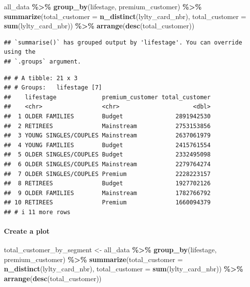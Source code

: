 \documentclass[
]{article}
\newenvironment{Shaded}{\begin{snugshade}}{\end{snugshade}}
\newcommand{\AttributeTok}[1]{\textcolor[rgb]{0.13,0.29,0.53}{#1}}
\newcommand{\FunctionTok}[1]{\textcolor[rgb]{0.13,0.29,0.53}{\textbf{#1}}}
\newcommand{\NormalTok}[1]{#1}
\newcommand{\OtherTok}[1]{\textcolor[rgb]{0.56,0.35,0.01}{#1}}
\newcommand{\SpecialCharTok}[1]{\textcolor[rgb]{0.81,0.36,0.00}{\textbf{#1}}}
\begin{document}
\begin{Shaded}
\begin{Highlighting}[]
\NormalTok{all\_data }\SpecialCharTok{\%\textgreater{}\%}
  \FunctionTok{group\_by}\NormalTok{(lifestage, premium\_customer) }\SpecialCharTok{\%\textgreater{}\%}
  \FunctionTok{summarize}\NormalTok{(}\AttributeTok{total\_customer =} \FunctionTok{n\_distinct}\NormalTok{(lylty\_card\_nbr),}
            \AttributeTok{total\_customer =} \FunctionTok{sum}\NormalTok{(lylty\_card\_nbr)) }\SpecialCharTok{\%\textgreater{}\%}
  \FunctionTok{arrange}\NormalTok{(}\FunctionTok{desc}\NormalTok{(total\_customer))}
\end{Highlighting}
\end{Shaded}

\begin{verbatim}
## `summarise()` has grouped output by 'lifestage'. You can override using the
## `.groups` argument.
\end{verbatim}

\begin{verbatim}
## # A tibble: 21 x 3
## # Groups:   lifestage [7]
##    lifestage             premium_customer total_customer
##    <chr>                 <chr>                     <dbl>
##  1 OLDER FAMILIES        Budget               2891942530
##  2 RETIREES              Mainstream           2753153856
##  3 YOUNG SINGLES/COUPLES Mainstream           2637061979
##  4 YOUNG FAMILIES        Budget               2415761554
##  5 OLDER SINGLES/COUPLES Budget               2332495098
##  6 OLDER SINGLES/COUPLES Mainstream           2279764274
##  7 OLDER SINGLES/COUPLES Premium              2228223157
##  8 RETIREES              Budget               1927702126
##  9 OLDER FAMILIES        Mainstream           1782766792
## 10 RETIREES              Premium              1660094379
## # i 11 more rows
\end{verbatim}

\hypertarget{create-a-plot-1}{%
\paragraph{Create a plot}\label{create-a-plot-1}}

\begin{Shaded}
\begin{Highlighting}[]
\NormalTok{total\_customer\_by\_segment }\OtherTok{\textless{}{-}}\NormalTok{ all\_data }\SpecialCharTok{\%\textgreater{}\%}
  \FunctionTok{group\_by}\NormalTok{(lifestage, premium\_customer) }\SpecialCharTok{\%\textgreater{}\%}
  \FunctionTok{summarize}\NormalTok{(}\AttributeTok{total\_customer =} \FunctionTok{n\_distinct}\NormalTok{(lylty\_card\_nbr),}
            \AttributeTok{total\_customer =} \FunctionTok{sum}\NormalTok{(lylty\_card\_nbr)) }\SpecialCharTok{\%\textgreater{}\%}
  \FunctionTok{arrange}\NormalTok{(}\FunctionTok{desc}\NormalTok{(total\_customer))}
\end{Highlighting}
\end{Shaded}
\end{document}
